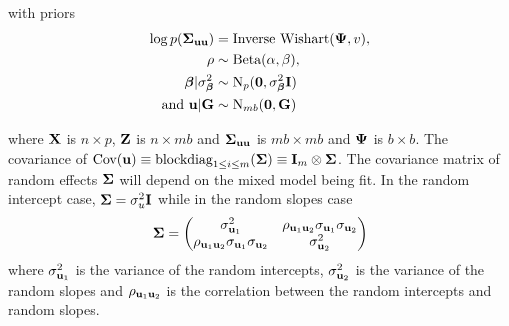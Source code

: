 \documentclass{amsart}[12pt]
\newcommand{\joc}[1]{{\color{red}#1}}
\begin{document}
\noindent with priors
\begin{align*}
	\log{p({\boldsymbol\Sigma}_{{\bf u}{\bf u}})} & = \text{Inverse Wishart}({\boldsymbol \Psi}, v),    \\
	\rho                       & \sim \text{Beta}(\alpha, \beta),             \\
	{\boldsymbol \beta}|\sigma^2_{\boldsymbol \beta}     & \sim \text{N}_p({\bf 0}, \sigma^2_{\boldsymbol \beta} {\bf I}) \\
	\mbox{ and } {\bf u}|{\bf G}       & \sim \text{N}_{mb}({\bf 0}, {\bf G})              
\end{align*}

\noindent where ${\bf X}$ is $n \times p$, ${\bf Z}$ is $n \times mb$ and ${\boldsymbol \Sigma}_{{\bf u} {\bf u}}$ is $mb \times mb$ and
${\boldsymbol \Psi}$ is $b \times b$. The covariance of $\mbox{Cov}({\bf u}) \equiv \text{blockdiag}_{1 \leq i \leq m} ({\boldsymbol \Sigma}) \equiv
{\bf I}_m \otimes {\boldsymbol\Sigma}$. The covariance matrix of random effects ${\boldsymbol \Sigma}$ will depend on the mixed model being
fit. In the random intercept case, ${\boldsymbol \Sigma} = \sigma_u^2 {\bf I}$ while in the random slopes case
\[
	{\boldsymbol \Sigma} = 
	\begin{pmatrix}
		\sigma_{{\bf u}_1}^2                                 & \rho_{{\bf u}_1 {\bf u}_2} \sigma_{{\bf u}_1} \sigma_{{\bf u}_2} \\
		\rho_{{\bf u}_1 {\bf u}_2} \sigma_{{\bf u}_1} \sigma_{{\bf u}_2} & \sigma_{{\bf u}_2}^2                                 
	\end{pmatrix}
\]
where $\sigma_{{\bf u}_1}^2$ is the variance of the random intercepts, $\sigma_{{\bf u}_2}^2$ is the variance of the
random slopes and $\rho_{{\bf u}_1 {\bf u}_2}$ is the correlation between the random intercepts and random slopes.

\end{document}
